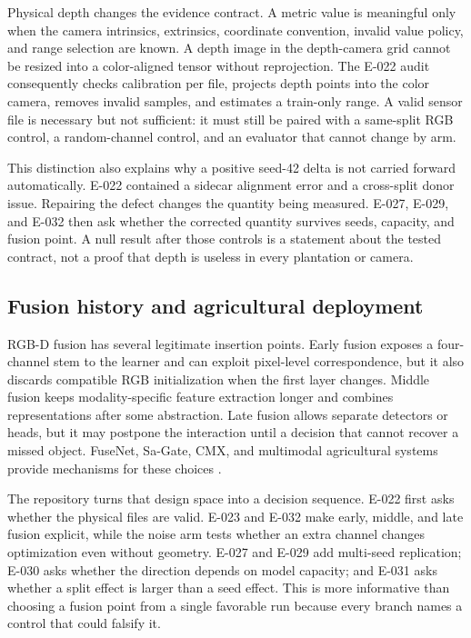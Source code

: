 \documentclass[preprint,12pt]{elsarticle}
\begin{document}
Physical depth changes the evidence contract. A metric value is meaningful
only when the camera intrinsics, extrinsics, coordinate convention, invalid
value policy, and range selection are known. A depth image in the depth-camera
grid cannot be resized into a color-aligned tensor without reprojection. The
E-022 audit consequently checks calibration per file, projects depth points
into the color camera, removes invalid samples, and estimates a train-only
range. A valid sensor file is necessary but not sufficient: it must still be
paired with a same-split RGB control, a random-channel control, and an
evaluator that cannot change by arm.

This distinction also explains why a positive seed-42 delta is not carried
forward automatically. E-022 contained a sidecar alignment error and a
cross-split donor issue. Repairing the defect changes the quantity being
measured. E-027, E-029, and E-032 then ask whether the corrected quantity
survives seeds, capacity, and fusion point. A null result after those controls
is a statement about the tested contract, not a proof that depth is useless in
every plantation or camera.

\subsection{Fusion history and agricultural deployment}
RGB-D fusion has several legitimate insertion points. Early fusion exposes a
four-channel stem to the learner and can exploit pixel-level correspondence,
but it also discards compatible RGB initialization when the first layer
changes. Middle fusion keeps modality-specific feature extraction longer and
combines representations after some abstraction. Late fusion allows separate
detectors or heads, but it may postpone the interaction until a decision that
cannot recover a missed object. FuseNet, Sa-Gate, CMX, and multimodal
agricultural systems provide mechanisms for these choices
\cite{hazirbas2016fusenet,chen2020sagate,zhang2023cmx,ophoff2019multimodal}.

The repository turns that design space into a decision sequence. E-022 first
asks whether the physical files are valid. E-023 and E-032 make early,
middle, and late fusion explicit, while the noise arm tests whether an extra
channel changes optimization even without geometry. E-027 and E-029 add
multi-seed replication; E-030 asks whether the direction depends on model
capacity; and E-031 asks whether a split effect is larger than a seed effect.
This is more informative than choosing a fusion point from a single favorable
run because every branch names a control that could falsify it.
\end{document}
